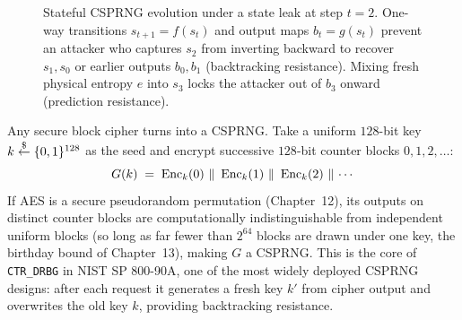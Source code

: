 \begin{figure}[htbp]
\caption{Stateful CSPRNG evolution under a state leak at step $t=2$. One-way transitions $s_{t+1} = f(s_t)$ and output maps $b_t = g(s_t)$ prevent an attacker who captures $s_2$ from inverting backward to recover $s_1, s_0$ or earlier outputs $b_0, b_1$ (backtracking resistance). Mixing fresh physical entropy $e$ into $s_3$ locks the attacker out of $b_3$ onward (prediction resistance).}
\label{ch17:fig-ratchet}
\end{figure}

\begin{example}
\label{ch17:ctr-prg}
Any secure block cipher turns into a CSPRNG. Take a uniform $128$-bit key $k \stackrel{\$}{\gets} \{0,1\}^{128}$ as the seed and encrypt successive $128$-bit counter blocks $0, 1, 2, \dots$:
\[
  G(k) \;=\; \operatorname{Enc}_k(0)\,\,\|\,\,\operatorname{Enc}_k(1)\,\,\|\,\,\operatorname{Enc}_k(2)\,\,\|\,\cdots
\]
If AES is a secure pseudorandom permutation (Chapter~12), its outputs on distinct counter blocks are computationally indistinguishable from independent uniform blocks (so long as far fewer than $2^{64}$ blocks are drawn under one key, the birthday bound of Chapter~13), making $G$ a CSPRNG. This is the core of \texttt{CTR\_DRBG} in NIST SP 800-90A, one of the most widely deployed CSPRNG designs: after each request it generates a fresh key $k'$ from cipher output and overwrites the old key $k$, providing backtracking resistance.
\end{example}

